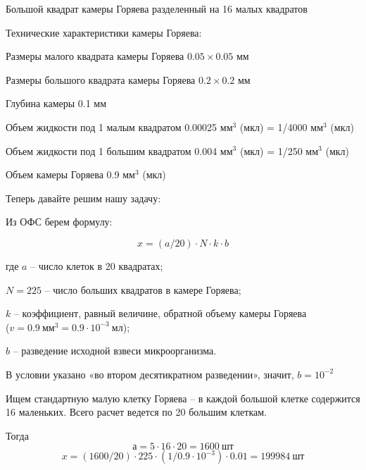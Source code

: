 
\begin{center}
    Большой квадрат камеры Горяева разделенный на 16 малых квадратов
\end{center}

Технические характеристики камеры Горяева:

Размеры малого квадрата камеры Горяева $0.05 \times 0.05$ мм

Размеры большого квадрата камеры Горяева $0.2 \times 0.2$ мм

Глубина камеры 0.1 мм

Объем жидкости под 1 малым квадратом 0.00025 мм$^3$ (мкл) = 1/4000 мм$^3$ (мкл)

Объем жидкости под 1 большим квадратом 0.004 мм$^3$ (мкл) = 1/250 мм$^3$ (мкл)

Объем камеры Горяева 0.9 мм$^3$ (мкл)

Теперь давайте решим нашу задачу:

Из ОФС берем формулу:

$$x=(a/20) \cdot N \cdot k \cdot b$$

где $a$ – число клеток в 20 квадратах;

$N = 225$ –  число больших квадратов в камере Горяева;

$k$ – коэффициент, равный величине, обратной объему камеры Горяева \\($v=0.9 \: \text{мм}^3=0.9 \cdot 10^{-3}\: \text{мл}$);

$b$ – разведение исходной взвеси микроорганизма.

В условии указано «во втором десятикратном разведении», значит, $b = 10^{-2}$

Ищем стандартную малую клетку Горяева – в каждой большой клетке содержится 16 маленьких. Всего расчет ведется по 20 большим клеткам.

Тогда $$а=5 \cdot 16 \cdot 20=1600 \: \text{шт}$$
$$x= (1600/20) \cdot 225 \cdot (1/0.9 \cdot 10^{-3}) \cdot 0.01= 199984 \: \text{шт}$$

